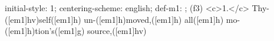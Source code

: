 initial-style: 1;
centering-scheme: english;
def-m1: \grealign;
(f3) <c>1.</c> Thy-([em1]hv)self([em1]h) un-([em1]h)moved,([em1]h) all([em1]h) mo-([em1]h)tion's([em1]g) source,([em1]hv)